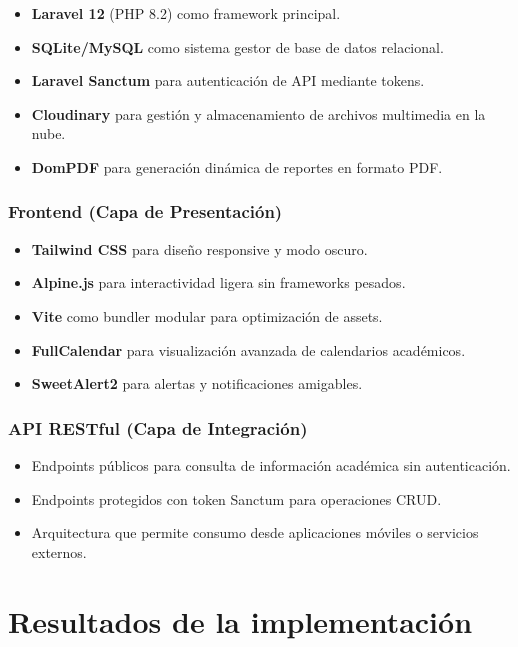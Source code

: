 \begin{itemize}
    \item \textbf{Laravel 12} (PHP 8.2) como framework principal.
    \item \textbf{SQLite/MySQL} como sistema gestor de base de datos relacional.
    \item \textbf{Laravel Sanctum} para autenticación de API mediante tokens.
    \item \textbf{Cloudinary} para gestión y almacenamiento de archivos multimedia en la nube.
    \item \textbf{DomPDF} para generación dinámica de reportes en formato PDF.
\end{itemize}

\subsubsection{Frontend (Capa de Presentación)}

\begin{itemize}
    \item \textbf{Tailwind CSS} para diseño responsive y modo oscuro.
    \item \textbf{Alpine.js} para interactividad ligera sin frameworks pesados.
    \item \textbf{Vite} como bundler modular para optimización de assets.
    \item \textbf{FullCalendar} para visualización avanzada de calendarios académicos.
    \item \textbf{SweetAlert2} para alertas y notificaciones amigables.
\end{itemize}

\subsubsection{API RESTful (Capa de Integración)}

\begin{itemize}
    \item Endpoints públicos para consulta de información académica sin autenticación.
    \item Endpoints protegidos con token Sanctum para operaciones CRUD.
    \item Arquitectura que permite consumo desde aplicaciones móviles o servicios externos.
\end{itemize}

\section{Resultados de la implementación}

